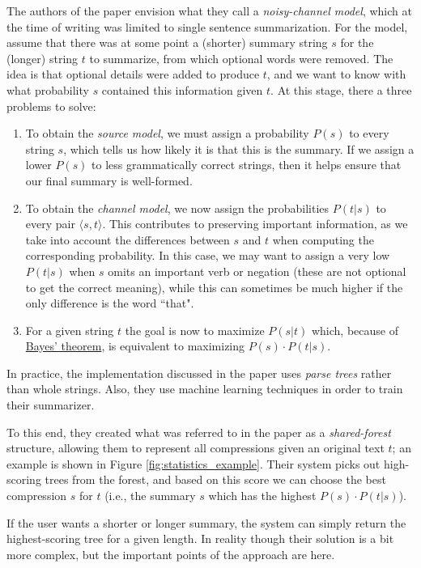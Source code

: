 The authors of the paper \cite{knight_statistics-based_2000} envision what they call a \textit{noisy-channel model}, which at the time of writing was limited to single sentence summarization. For the  model, assume that there was at some point a (shorter) summary string $s$ for the (longer) string $t$ to summarize, from which optional words were removed. The idea is that optional details were added to produce $t$, and we want to know with what probability $s$ contained this information given $t$. At this stage, there a three problems to solve:
\begin{enumerate}[noitemsep]
\item To obtain the \textit{source model}, we must assign a probability $P(s)$ to every string $s$, which tells us how likely it is that this is the summary. If we assign a lower $P(s)$ to less grammatically correct strings, then it helps ensure that our final summary is well-formed.
\item To obtain the \textit{channel model}, we now assign the probabilities $P(t \vert s)$ to every pair $\langle s, t \rangle$. This contributes to preserving important information, as we take into account the differences between $s$ and $t$ when computing the corresponding probability. In this case, we may want to assign a very low $P(t \vert s)$ when $s$ omits an important verb or negation (these are not optional to get the correct meaning), while this can sometimes be much higher if the only difference is the word ``that".
\item For a given string $t$ the goal is now to maximize $P(s \vert t)$ which, because of \href{https://www.investopedia.com/terms/b/bayes-theorem.asp}{Bayes' theorem}, is equivalent to maximizing $P(s) \cdot P(t \vert s)$.
\end{enumerate}

In practice, the implementation discussed in the paper uses \textit{parse trees} rather than whole strings. Also, they use machine learning techniques in order to train their summarizer.

To this end, they created what was referred to in the paper as a \textit{shared-forest} structure, allowing them to represent all compressions given an original text $t$; an example is shown in Figure \ref{fig:statistics_example}. Their system picks out high-scoring trees from the forest, and based on this score we can choose the best compression $s$ for $t$ (i.e., the summary $s$ which has the highest $P(s) \cdot P(t \vert s)$).

If the user wants a shorter or longer summary, the system can simply return the highest-scoring tree for a given length. In reality though their solution is a bit more complex, but the important points of the approach are here.

